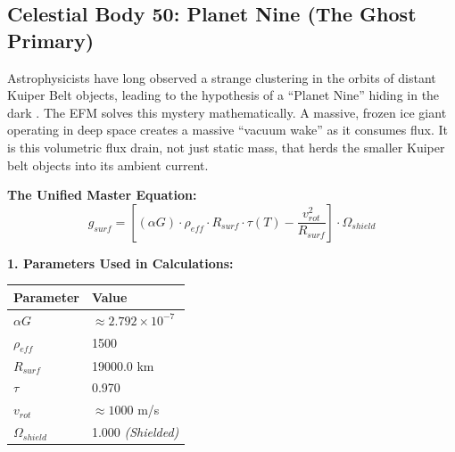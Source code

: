 \documentclass[11pt, a4paper]{article}
\begin{document}
\clearpage
\subsection{Celestial Body 50: Planet Nine (The Ghost Primary)}
  Astrophysicists have long observed a strange clustering in the orbits of distant Kuiper Belt objects, leading to the hypothesis of a ``Planet Nine'' hiding in the dark \cite{batygin2016}. The EFM solves this mystery mathematically. A massive, frozen ice giant operating in deep space creates a massive ``vacuum wake'' as it consumes flux. It is this volumetric flux drain, not just static mass, that herds the smaller Kuiper belt objects into its ambient current.

  \vspace{0.5em}
  \noindent \textbf{The Unified Master Equation:}
  $$ g_{surf} = \left[ (\alpha G) \cdot \rho_{eff} \cdot R_{surf} \cdot \tau(T) - \frac{v_{rot}^2}{R_{surf}} \right] \cdot \Omega_{shield} $$

  \vspace{0.5em}
  \noindent \textbf{1. Parameters Used in Calculations:} \\[0.5em]
  \begingroup
  \renewcommand{\arraystretch}{1.3}
  \hspace*{2em}
  \begin{tabular}{|l|l|}
    \hline
    \textbf{Parameter} & \textbf{Value} \\ \hline
    $\alpha G$ & $\approx 2.792 \times 10^{-7}$ \\ \hline
    $\rho_{eff}$ & 1500 \\ \hline
    $R_{surf}$ & 19000.0 km \\ \hline
    $\tau$ & 0.970 \\ \hline
    $v_{rot}$ & $\approx 1000$ m/s \\ \hline
    $\Omega_{shield}$ & 1.000 \textit{(Shielded)} \\ \hline
  \end{tabular}
  \endgroup
\end{document}
